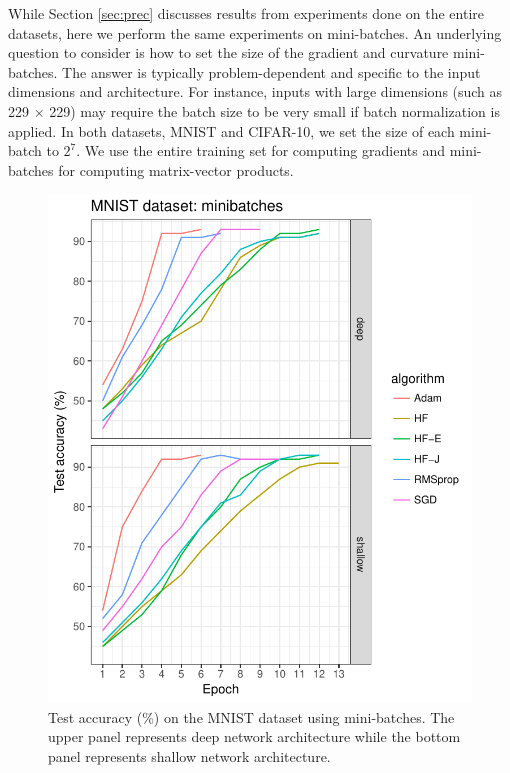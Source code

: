 \documentclass[10pt,twocolumn,letterpaper]{article}
\begin{document}
While Section \ref{sec:prec} discusses results from experiments done on the entire datasets, here we perform the same experiments on mini-batches. An underlying question to consider is how to set the size of the gradient and curvature mini-batches. The answer is typically problem-dependent and specific to the input dimensions and architecture. For instance, inputs with large dimensions (such as 229 $\times$ 229) may require the batch size to be very small if batch normalization is applied. In both datasets, MNIST and CIFAR-10, we set the size of each mini-batch to $2^7$. We use the entire training set  for computing gradients and mini-batches for computing matrix-vector products.
\begin{figure}
\begin{center}
\includegraphics[scale=0.7]{plot_3.pdf}
\caption{Test accuracy (\%) on the MNIST dataset using mini-batches. The upper panel represents deep network architecture while the bottom panel represents shallow network architecture.}
\label{fig:data_mnist_2}
\end{center}
\end{figure}  
\end{document}
